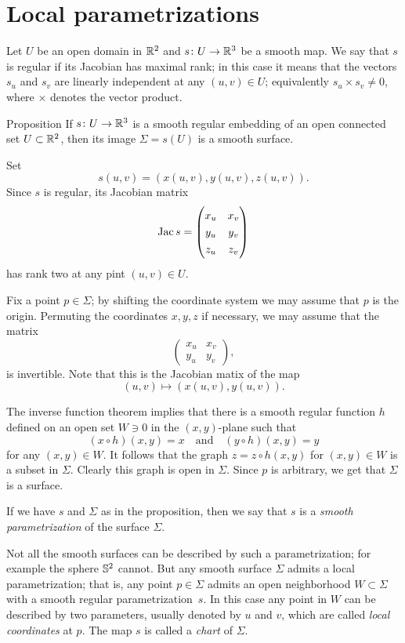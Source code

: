 \section{Local parametrizations}

Let $U$ be an open domain in $\mathbb{R}^2$ and $s\colon U\to \mathbb{R}^3$ be a smooth map.
We say that $s$ is regular if its Jacobian has maximal rank;
in this case it means that the vectors $s_u$ and $s_v$ are linearly independent at any $(u,v)\in U$;
equivalently $s_u\times s_v\ne 0$, where $\times$ denotes the vector product.

\begin{thm}{Proposition}\label{prop:graph-chart}
If $s\colon U\to \mathbb{R}^3$ is a smooth regular embedding %
of an open connected set $U\subset \mathbb{R}^2$, then its image $\Sigma=s(U)$ is a smooth surface.
\end{thm}

Set 
\[s(u,v)=(x(u,v),y(u,v),z(u,v)).\]
Since $s$ is regular, its Jacobian matrix
\[\Jac s=
\renewcommand\arraystretch{1.3}
\begin{pmatrix}
x_u&x_v\\
y_u&y_v\\
z_u&z_v
\end{pmatrix}
\]
has rank two at any pint $(u,v)\in U$.

Fix a point $p\in \Sigma$; by shifting the coordinate system we may assume that $p$ is the origin.
Permuting the coordinates $x,y,z$ if necessary, we may assume that 
the matrix 
\[
\renewcommand\arraystretch{1.3}
\begin{pmatrix}
x_u&x_v\\
y_u&y_v
\end{pmatrix},
\] 
is invertible.
Note that this is the Jacobian matix of the map
\[(u,v)\mapsto (x(u,v),y(u,v)).\]

The inverse function theorem implies that there is a smooth regular function $h$ defined on an open set $W\ni 0$ in the $(x,y)$-plane
such that 
\[(x\circ h)(x,y)=x\quad\text{and}\quad (y\circ h)(x,y)=y\]
for any $(x,y)\in W$.
It follows that the graph $z=z\circ h(x,y)$ for $(x,y)\in W$ is a subset in $\Sigma$.
Clearly this graph is open in $\Sigma$. %
Since $p$ is arbitrary, we get that $\Sigma$ is a surface.
\qeds

If we have $s$ and $\Sigma$ as in the proposition, then we say that $s$ is a \emph{smooth parametrization} of the surface $\Sigma$. 

Not all the smooth surfaces can be described by such a parametrization;
for example the sphere $\mathbb{S}^2$ cannot.
But any smooth surface $\Sigma$ admits a local parametrization; that is, any point $p\in\Sigma$ admits an open neighborhood $W\subset \Sigma$ with a smooth regular parametrization~$s$.
In this case any point in $W$ can be described by two parameters, usually denoted by $u$ and $v$, 
which are called \emph{local coordinates} at $p$.
The map $s$ is called a \emph{chart} of $\Sigma$.

